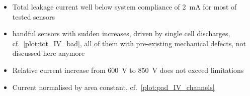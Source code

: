 \begin{itemize}
	\item Total leakage current well below system compliance of \SI{2}{\milli\ampere} for most of tested sensors
	\item handful sensors with sudden increases, driven by single cell discharges, cf.~\ref{plot:tot_IV_bad}, all of them with pre-existing mechanical defects, not discussed here anymore 
\end{itemize}

\begin{itemize}
	\item Relative current increase from \SI{600}{\volt} to \SI{850}{\volt} does not exceed limitations
	\item Current normalised by area constant, cf.~\ref{plot:pad_IV_channels}
\end{itemize}


